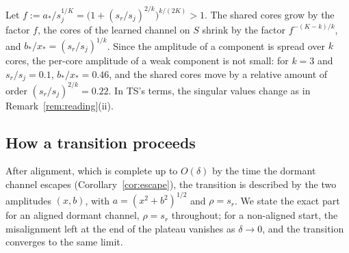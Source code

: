 \documentclass[11pt]{article}
\newcommand{\TS}{\textsf{TS}}
\theoremstyle{definition}
\numberwithin{equation}{section}
\begin{document}
Let $f:=a_*/s_j^{1/K}=\big(1+(s_r/s_j)^{2/k}\big)^{k/(2K)}>1$. The shared cores grow by the factor $f$, the cores of the learned channel on $S$ shrink by the factor $f^{-(K-k)/k}$, and $b_*/x_*=(s_r/s_j)^{1/k}$. Since the amplitude of a component is spread over $k$ cores, the per-core amplitude of a weak component is not small: for $k=3$ and $s_r/s_j=0.1$, $b_*/x_*=0.46$, and the shared cores move by a relative amount of order $(s_r/s_j)^{2/k}=0.22$. In \TS's terms, the singular values change as in Remark~\ref{rem:reading}(ii).

\subsection{How a transition proceeds}

After alignment, which is complete up to $O(\delta)$ by the time the dormant channel escapes (Corollary~\ref{cor:escape}), the transition is described by the two amplitudes $(x,b)$, with $a=(x^2+b^2)^{1/2}$ and $\rho=s_r$. We state the exact part for an aligned dormant channel, $\rho=s_r$ throughout; for a non-aligned start, the misalignment left at the end of the plateau vanishes as $\delta\to0$, and the transition converges to the same limit.
\end{document}
